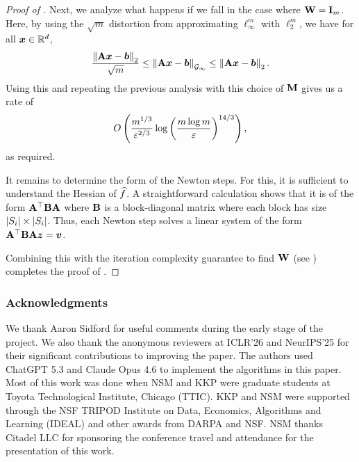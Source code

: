 \begin{proof}[Proof of ]
Next, we analyze what happens if we fall in the case where $\mathbf{W}=\mathbf{I}_m$. Here, by using the $\sqrt{m}$ distortion from approximating $\ell_{\infty}^m$ with $\ell_{2}^m$, we have for all $\bm{x}\in\mathbb{R}^d$,
\begin{align*}
    \frac{\left\lVert \mathbf{A}\bm{x}-\bm{b} \right\rVert_2}{\sqrt{m}} \le \left\lVert \mathbf{A}\bm{x}-\bm{b} \right\rVert_{\mathcal{G}_{\infty}} \le \left\lVert \mathbf{A}\bm{x}-\bm{b} \right\rVert_2.
\end{align*}
Using this and repeating the previous analysis with this choice of $\mathbf{M}$ gives us a rate of
\begin{align*}
    O\left(\frac{m^{1/3}}{\varepsilon^{2/3}}\log\left(\frac{m\log m}{\varepsilon}\right)^{14/3}\right),
\end{align*}
as required.

It remains to determine the form of the Newton steps. For this, it is sufficient to understand the Hessian of $\widehat{f}$. A straightforward calculation shows that it is of the form $\mathbf{A}^{\top}\mathbf{B}\mathbf{A}$ where $\mathbf{B}$ is a block-diagonal matrix where each block has size $\left\lvert S_i \right\rvert \times \left\lvert S_i \right\rvert$. Thus, each Newton step solves a linear system of the form $\mathbf{A}^{\top}\mathbf{B}\mathbf{A}\bm{z} = \bm{v}$.

Combining this with the iteration complexity guarantee to find $\mathbf{W}$ (see ) completes the proof of .
\end{proof}





\subsubsection*{Acknowledgments}
We thank Aaron Sidford for useful comments during the early stage of the project. We also thank the anonymous reviewers at ICLR'26 and NeurIPS'25 for their significant contributions to improving the paper. The authors used ChatGPT 5.3 and Claude Opus 4.6 to implement the algorithms in this paper. Most of this work was done when NSM and KKP were graduate students at Toyota Technological Institute, Chicago (TTIC). KKP and NSM were supported through the NSF TRIPOD Institute on Data, Economics, Algorithms and Learning (IDEAL) and other awards from DARPA and NSF. NSM thanks Citadel LLC for sponsoring the conference travel and attendance for the presentation of this work.